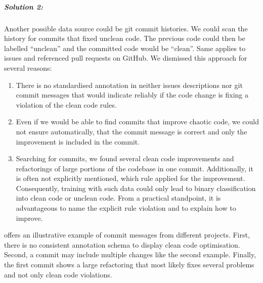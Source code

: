 \subparagraph{Solution 2:}
Another possible data source could be git commit histories. We could scan the history for commits that fixed unclean code. The previous code could then be labelled \enquote{unclean} and the committed code would be \enquote{clean}.
Same applies to issues and referenced pull requests on GitHub.
We dismissed this approach for several reasons:
\begin{enumerate}
    \item There is no standardised annotation in neither issues descriptions nor git commit messages that would indicate reliably if the code change is fixing a violation of the clean code rules.
    \item Even if we would be able to find commits that improve chaotic code, we could not ensure automatically, that the commit message is correct and only the improvement is included in the commit.
    \item Searching for commits, we found several clean code improvements and refactorings of large portions of the codebase in one commit. Additionally, it is often not explicitly mentioned, which rule applied for the improvement. Consequently, training with such data could only lead to binary classification into clean code or unclean code. From a practical standpoint, it is advantageous to name the explicit rule violation and to explain how to improve.
\end{enumerate}
 offers an illustrative example of commit messages from different projects. First, there is no consistent annotation schema to display clean code optimisation. Second, a commit may include multiple changes like the second example. Finally, the first commit shows a large refactoring that most likely fixes several problems and not only clean code violations.

